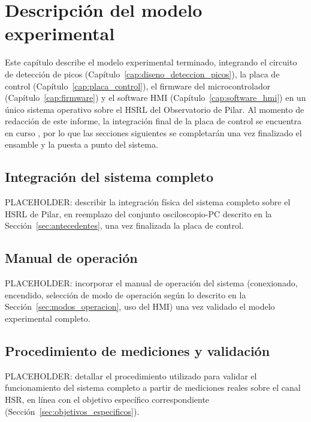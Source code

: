 \chapter{Descripci\'on del modelo experimental}
\label{cap:modelo_experimental}

Este cap\'itulo describe el modelo experimental terminado, integrando
el circuito de detecci\'on de picos (Cap\'itulo~\ref{cap:diseno_deteccion_picos}),
la placa de control (Cap\'itulo~\ref{cap:placa_control}), el firmware
del microcontrolador (Cap\'itulo~\ref{cap:firmware}) y el software HMI
(Cap\'itulo~\ref{cap:software_hmi}) en un \'unico sistema operativo sobre
el HSRL del Observatorio de Pilar. Al momento de redacci\'on de este
informe, la integraci\'on final de la placa de control se encuentra en
curso \cite{informeAbril2026}, por lo que las secciones siguientes se
completar\'an una vez finalizado el ensamble y la puesta a punto del
sistema.

\section{Integraci\'on del sistema completo}
\label{sec:integracion_sistema}

PLACEHOLDER: describir la integraci\'on f\'isica del sistema completo
sobre el HSRL de Pilar, en reemplazo del conjunto osciloscopio-PC
descrito en la Secci\'on~\ref{sec:antecedentes}, una vez finalizada la
placa de control.

\section{Manual de operaci\'on}
\label{sec:manual_operacion}

PLACEHOLDER: incorporar el manual de operaci\'on del sistema (conexionado,
encendido, selecci\'on de modo de operaci\'on seg\'un lo descrito en la
Secci\'on~\ref{sec:modos_operacion}, uso del HMI) una vez validado el
modelo experimental completo.

\section{Procedimiento de mediciones y validaci\'on}
\label{sec:procedimiento_mediciones}

PLACEHOLDER: detallar el procedimiento utilizado para validar el
funcionamiento del sistema completo a partir de mediciones reales sobre
el canal HSR, en l\'inea con el objetivo espec\'ifico correspondiente
(Secci\'on~\ref{sec:objetivos_especificos}).
